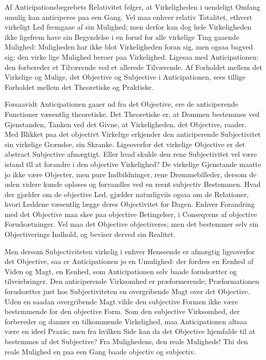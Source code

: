 \documentclass[12pt]{book}
\newcommand{\opage}[1]{\marginnote{\footnotesize\textit{[#1]}}}
\begin{document}
Af Anticipationsbegrebets Relativitet følger, at Virkeligheden
i uendeligt Omfang umulig kan anticiperes paa een
Gang. Vel maa enhver relativ Totalitet, ethvert virkeligt
Led fremgaae af sin Mulighed; men derfor kan dog hele
Virkeligheden ikke ligefrem have sin Begyndelse i en forud for
alle virkelige Ting gaaende Mulighed: Muligheden har ikke
blot Virkeligheden foran sig, men ogsaa bagved sig; den virke%
\opage{124}lige Mulighed beroer paa Virkelighed. Ligesaa med Anticipationen:
den forbereder et Tilværende ved et allerede Tilværende.
Af Forholdet mellem det Virkelige og Mulige, det Objective
og Subjective i Anticipationen, sees tillige Forholdet mellem
det Theoretiske og Praktiske.

Forsaavidt Anticipationen gaaer ud fra det Objective, ere
de anticiperende Functioner væsentlig theoretiske. Det Theoretiske
er, at Dommen bestemmes ved Gjenstanden, Tanken
ved det Givne, at Virkeligheden, det Objective, raader. Med
Blikket paa det objectivt Virkelige erkjender den anticiperende
Subjectivitet sin virkelige Grændse, sin Skranke. Ligeoverfor
det virkelige Objective er det abstract Subjective afmægtigt.
Eller hvad skulde den rene Subjectivitet vel være istand tll %
at forandre i den objective Virkelighed? De virkelige Gjenstande
maatte jo ikke være Objecter, men pure Indbildninger,
rene Drømmebilleder, dersom de uden videre kunde opløses
og forvandles ved en reent subjectiv Bestemmen. Hvad der
gjælder om de objective Led, gjælder naturligviis ogsaa om de
Relationer, hvori Leddene væsentlig lægge deres Objectivitet
for Dagen. Enhver Forandring med det Objective maa skee
paa objective Betingelser, i Conseqvens af objective Forudsætninger.
Vel maa det Objective objectiveres; men det bestemmer
selv sin Objectiverings Indhold, og beviser derved sin
Realitet.

Men dersom Subjectiviteten virkelig i enhver Henseende
er afmægtig ligeoverfor det Objective, saa er Anticipationen
jo en Umulighed: der fordres en Eenhed af Viden og Magt,
en Eenhed, som Anticipationen selv baade forudsætter og tilveiebringer.
Den anticiperende Virksomhed er præformerende;
Præformationen forudsætter just hos Subjectiviteten en overgribende
Magt over det Objective. Uden en saadan overgribende
Magt vilde den subjective Formen ikke være bestemmende
for den objective Form. Som den subjective Virksomhed,
der forbereder og danner en tilkommende Virkelighed,
\opage{125}maa Anticipationen altsaa være en ideel Praxis; men fra
hvilken Side kan da det Objective hjemfalde til at bestemmes
af det Subjective? Fra Mulighedens, den reale Muligheds!
Thi den reale Mulighed en paa een Gang baade objectiv og %
subjectiv.
\end{document}

